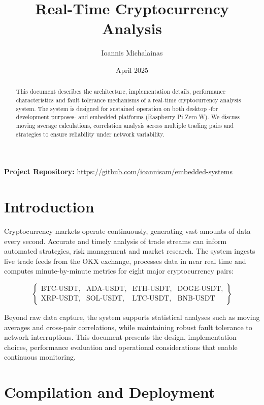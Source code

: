 \documentclass{article}
\title{Real-Time Cryptocurrency Analysis}
\author{Ioannis Michalainas}
\date{April 2025}
\begin{document}
\maketitle
\noindent\textbf{Project Repository:} \href{https://github.com/ioannisam/embedded-systems}{https://github.com/ioannisam/embedded-systems}

\begin{abstract}
This document describes the architecture, implementation details, performance characteristics and fault tolerance mechanisms of a real-time cryptocurrency analysis system. The system is designed for sustained operation on both desktop -for development purposes- and embedded platforms (Raspberry Pi Zero W). We discuss moving average calculations, correlation analysis across multiple trading pairs and strategies to ensure reliability under network variability.
\end{abstract}

\tableofcontents

\section{Introduction}
Cryptocurrency markets operate continuously, generating vast amounts of data every second. Accurate and timely analysis of trade streams can inform automated strategies, risk management and market research. The system ingests live trade feeds from the OKX exchange, processes data in near real time and computes minute-by-minute metrics for eight major cryptocurrency pairs:

\[
\left\{
\begin{array}{cccc}
\text{BTC-USDT}, & \text{ADA-USDT}, & \text{ETH-USDT}, & \text{DOGE-USDT}, \\
\text{XRP-USDT}, & \text{SOL-USDT}, & \text{LTC-USDT}, & \text{BNB-USDT}
\end{array}
\right\}
\]

Beyond raw data capture, the system supports statistical analyses such as moving averages and cross-pair correlations, while maintaining robust fault tolerance to network interruptions. This document presents the design, implementation choices, performance evaluation and operational considerations that enable continuous monitoring.

\section{Compilation and Deployment}
\end{document}
